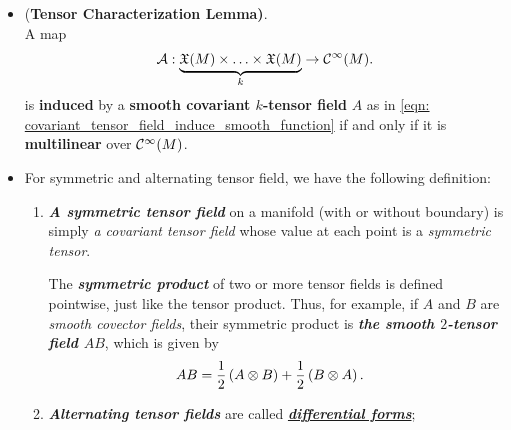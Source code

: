 \documentclass[11pt]{article}
\begin{document}
\begin{itemize}
\item \begin{lemma} (\textbf{Tensor Characterization Lemma)}.\citep{lee2003introduction}\\
A map 
\begin{align}
\mathcal{A}: \underbrace{\mathfrak{X}(M)\times \ldots \times \mathfrak{X}(M)}_{k} \rightarrow  {\mathcal C}^{\infty}(M).  \label{eqn: tensor_characterization}
\end{align} is \textbf{induced} by a \textbf{smooth covariant $k$-tensor field} $A$ as in \eqref{eqn: covariant_tensor_field_induce_smooth_function} if and only if it is \textbf{multilinear} over ${\mathcal C}^{\infty}(M)$.
\end{lemma}

\item \begin{definition} For symmetric and alternating tensor field, we have the following definition:
\begin{enumerate}
\item \emph{\textbf{A symmetric tensor field}} on a manifold (with or without boundary) is simply \emph{a covariant tensor field} whose value at each point is a \emph{symmetric tensor}. 

The \emph{\textbf{symmetric product}} of two or more tensor fields is defined pointwise, just like the tensor product. Thus, for example, if $A$ and $B$ are \emph{smooth covector fields}, their symmetric product is \emph{\textbf{the smooth $2$-tensor field $AB$}}, which is given by
\begin{align*}
AB &= \frac{1}{2}\left(A \otimes B\right) + \frac{1}{2}\left(B \otimes A\right).
\end{align*}


\item \emph{\textbf{Alternating tensor fields}} are called \underline{\emph{\textbf{differential forms}}};
\end{enumerate}
\end{definition}
\end{itemize}
\end{document}
